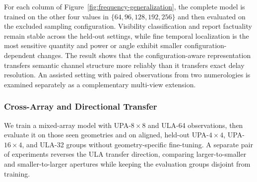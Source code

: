 For each column of Figure~\ref{fig:frequency-generalization}, the complete model is trained on the
other four values in $\{64,96,128,192,256\}$ and then evaluated on the excluded sampling
configuration. Visibility classification and report factuality remain stable across the held-out
settings, while fine temporal localization is the most sensitive quantity and power or angle exhibit
smaller configuration-dependent changes. The result shows that the configuration-aware
representation transfers semantic channel structure more reliably than it transfers exact delay
resolution. An assisted setting with paired observations from two numerologies is examined separately
as a complementary multi-view extension.

\subsubsection{Cross-Array and Directional Transfer}

We train a mixed-array model with UPA-$8{\times}8$ and ULA-64 observations, then evaluate it on
those seen geometries and on aligned, held-out UPA-$4{\times}4$, UPA-$16{\times}4$, and ULA-32
groups without geometry-specific fine-tuning. A separate pair of experiments reverses the ULA
transfer direction, comparing larger-to-smaller and smaller-to-larger apertures while keeping the
evaluation groups disjoint from training.

